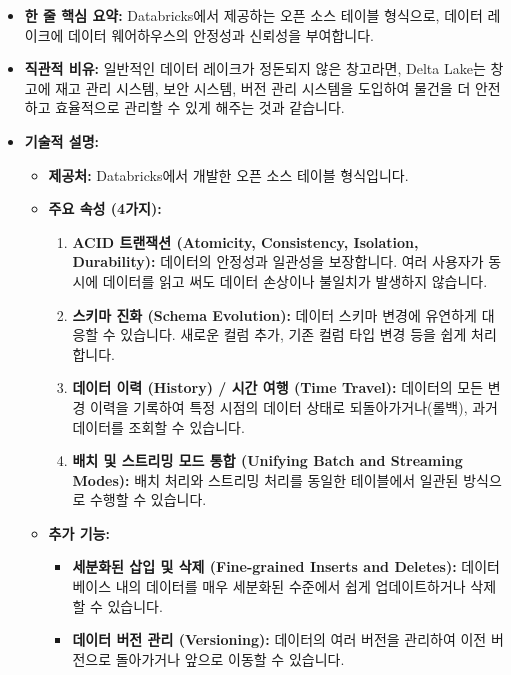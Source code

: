 \documentclass[11pt,a4paper]{article}
\theoremstyle{definition}
\begin{document}
\begin{itemize}
    \item \textbf{한 줄 핵심 요약:} Databricks에서 제공하는 오픈 소스 테이블 형식으로, 데이터 레이크에 데이터 웨어하우스의 안정성과 신뢰성을 부여합니다.
    \item \textbf{직관적 비유:} 일반적인 데이터 레이크가 정돈되지 않은 창고라면, Delta Lake는 창고에 재고 관리 시스템, 보안 시스템, 버전 관리 시스템을 도입하여 물건을 더 안전하고 효율적으로 관리할 수 있게 해주는 것과 같습니다.
    \item \textbf{기술적 설명:}
    \begin{itemize}
        \item \textbf{제공처:} Databricks에서 개발한 오픈 소스 테이블 형식입니다.
        \item \textbf{주요 속성 (4가지):}
        \begin{enumerate}
            \item \textbf{ACID 트랜잭션 (Atomicity, Consistency, Isolation, Durability):} 데이터의 안정성과 일관성을 보장합니다. 여러 사용자가 동시에 데이터를 읽고 써도 데이터 손상이나 불일치가 발생하지 않습니다.
            \item \textbf{스키마 진화 (Schema Evolution):} 데이터 스키마 변경에 유연하게 대응할 수 있습니다. 새로운 컬럼 추가, 기존 컬럼 타입 변경 등을 쉽게 처리합니다.
            \item \textbf{데이터 이력 (History) / 시간 여행 (Time Travel):} 데이터의 모든 변경 이력을 기록하여 특정 시점의 데이터 상태로 되돌아가거나(롤백), 과거 데이터를 조회할 수 있습니다.
            \item \textbf{배치 및 스트리밍 모드 통합 (Unifying Batch and Streaming Modes):} 배치 처리와 스트리밍 처리를 동일한 테이블에서 일관된 방식으로 수행할 수 있습니다.
        \end{enumerate}
        \item \textbf{추가 기능:}
        \begin{itemize}
            \item \textbf{세분화된 삽입 및 삭제 (Fine-grained Inserts and Deletes):} 데이터베이스 내의 데이터를 매우 세분화된 수준에서 쉽게 업데이트하거나 삭제할 수 있습니다.
            \item \textbf{데이터 버전 관리 (Versioning):} 데이터의 여러 버전을 관리하여 이전 버전으로 돌아가거나 앞으로 이동할 수 있습니다.
        \end{itemize}
    \end{itemize}
\end{itemize}
\end{document}

